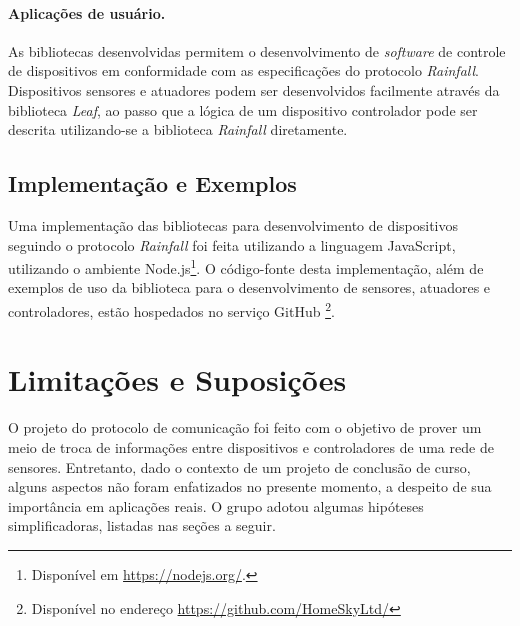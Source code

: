\paragraph*{Aplicações de usuário.} As bibliotecas desenvolvidas permitem o desenvolvimento de \textit{software} de controle de dispositivos em conformidade com as especificações do protocolo \textit{Rainfall}. Dispositivos sensores e atuadores podem ser desenvolvidos facilmente através da biblioteca \textit{Leaf}, ao passo que a lógica de um dispositivo controlador pode ser descrita utilizando-se a biblioteca \textit{Rainfall} diretamente.

\subsection{Implementação e Exemplos}
Uma implementação das bibliotecas para desenvolvimento de dispositivos seguindo o protocolo \textit{Rainfall} foi feita utilizando a linguagem JavaScript, utilizando o ambiente Node.js\footnote{Disponível em \url{https://nodejs.org/}.}. O código-fonte desta implementação, além de exemplos de uso da biblioteca para o desenvolvimento de sensores, atuadores e controladores, estão hospedados no serviço GitHub \footnote{Disponível no endereço \url{https://github.com/HomeSkyLtd/}}.

\section{Limitações e Suposições}
O projeto do protocolo de comunicação foi feito com o objetivo de prover um meio de troca de informações entre dispositivos e controladores de uma rede de sensores. Entretanto, dado o contexto de um projeto de conclusão de curso, alguns aspectos não foram enfatizados no presente momento, a despeito de sua importância em aplicações reais. O grupo adotou algumas hipóteses simplificadoras, listadas nas seções a seguir.

